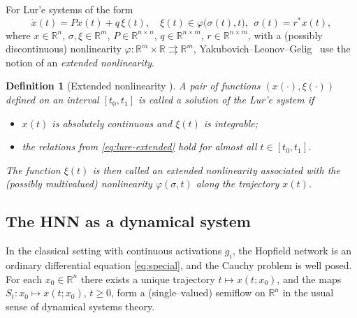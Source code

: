 \documentclass[journal]{IEEEtran}
\theoremstyle{myplain}
\newtheorem{definition}{Definition}
\begin{document}
For Lur'e systems of the form
\begin{equation}
  \dot x(t) = P x(t) + q\,\xi(t), \quad
     \xi(t) \in \varphi\bigl(\sigma(t),t\bigr),\ \
     \sigma(t)=r^{*}x(t),
  \label{eq:lure-extended}
\end{equation}
where \(x\in\mathbb{R}^n\), \(\sigma,\xi\in\mathbb{R}^m\),
\(P\in\mathbb{R}^{n\times n}\), \(q\in\mathbb{R}^{n\times m}\),
\(r\in\mathbb{R}^{n\times m}\), with a (possibly discontinuous) nonlinearity
$\varphi \!:\!\mathbb{R}^m \! \times\mathbb{R}\rightrightarrows\mathbb{R}^m$,
Yakubovich--Leonov--Gelig~\cite{YLG} use the notion of an \emph{extended
nonlinearity}.

\begin{definition}[Extended nonlinearity {\cite[Sec.~1.2]{YLG}}]\label{extended_nonlinearity}
A pair of functions $(x(\cdot),\xi(\cdot))$ defined on an interval
$[t_0,t_1]$ is called a solution of the Lur'e system if
\begin{itemize}
  \item $x(t)$ is absolutely continuous and $\xi(t)$ is integrable;
  \item the relations from \eqref{eq:lure-extended} 
  hold for almost all $t\in[t_0,t_1]$.
\end{itemize}
The function $\xi(t)$ is then called an \emph{extended nonlinearity}
associated with the (possibly multivalued) nonlinearity
$\varphi(\sigma,t)$ along the trajectory $x(t)$.
\end{definition}



\subsection{The HNN as a dynamical system}\label{subsec:HNN-dyn-sys}

In the classical setting with continuous activations $g_i$, the
Hopfield network is an ordinary differential
equation \eqref{eq:special}, 
and the Cauchy problem is well posed. For each $x_0\in\mathbb{R}^n$
there exists a unique trajectory $t\mapsto x(t;x_0)$, and the maps
$S_t:x_0\mapsto x(t;x_0)$, $t\ge0$, form a (single–valued) semiflow on
$\mathbb{R}^n$ in the usual sense of dynamical systems theory.
\end{document}
